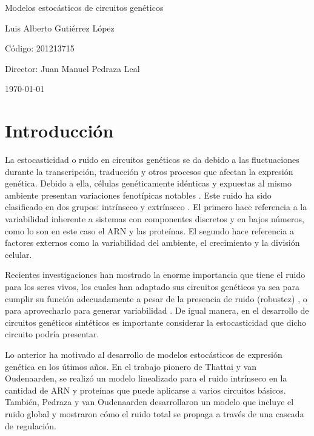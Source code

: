 \documentclass[12pt]{article}
\begin{document}
\begin{center}
\Huge
Modelos estoc\'asticos de circuitos gen\'eticos

\vspace{3mm}
\Large Luis Alberto Guti\'errez L\'opez

\large
C\'odigo: 201213715


\vspace{2mm}
\Large
Director: Juan Manuel Pedraza Leal

\normalsize
\vspace{2mm}

\today
\end{center}


\normalsize
\section{Introducci\'on}

La estocasticidad o ruido en circuitos gen\'eticos se da debido a las fluctuaciones durante la transcripci\'on, traducci\'on \cite{kaern05} y otros procesos que afectan la expresi\'on gen\'etica. Debido a ella, c\'elulas gen\'eticamente id\'enticas y expuestas al mismo ambiente presentan variaciones fenot\'ipicas notables \cite{kaern05} \cite{elowitz02} \cite{pedraza05}. Este ruido ha sido clasificado en dos grupos: intr\'inseco y extr\'inseco \cite{elowitz02} \cite{paulsson05}. El primero hace referencia a la variabilidad inherente a sistemas con componentes discretos y en bajos n\'umeros, como lo son en este caso el ARN y las prote\'inas. El segundo hace referencia a factores externos como la variabilidad del ambiente, el crecimiento y la divisi\'on celular.

Recientes investigaciones han mostrado la enorme importancia que tiene el ruido para los seres vivos, los cuales han adaptado sus circuitos gen\'eticos ya sea para cumplir su funci\'on adecuadamente a pesar de la presencia de ruido (robustez) \cite{alon99}, o para aprovecharlo para generar variabilidad \cite{arkin98}. De igual manera, en el desarrollo de circuitos gen\'eticos sint\'eticos es importante considerar la estocasticidad que dicho circuito podr\'ia presentar.

Lo anterior ha motivado al desarrollo de modelos estoc\'asticos de expresi\'on gen\'etica en los \'utimos a\~nos. En el trabajo pionero de Thattai y van Oudenaarden,  \cite{thattai01} se realiz\'o un modelo linealizado para el ruido intr\'inseco en la cantidad de ARN y prote\'inas que puede aplicarse a varios circuitos b\'asicos. Tambi\'en, Pedraza y van Oudenaarden \cite{pedraza05} desarrollaron un  modelo que incluye el ruido global y mostraron c\'omo el ruido total se propaga a trav\'es de una cascada de regulaci\'on.
\end{document}
